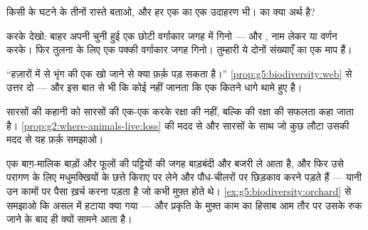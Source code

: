 \begin{exercise}[$\star$]\label{exo:g5:biodiversity:7}
किसी  के घटने के तीनों रास्ते बताओ, और हर एक का एक उदाहरण भी।
\emph{} का क्या अर्थ है?
\end{exercise}

\begin{exercise}[$\star$]\label{exo:g5:biodiversity:8}
करके देखो: बाहर अपनी चुनी हुई एक छोटी वर्गाकार जगह में  गिनो
---  और , नाम लेकर या वर्णन करके। फिर तुलना के लिए एक पक्की
वर्गाकार जगह गिनो। तुम्हारी ये दोनों संख्याएँ  का एक माप
हैं।
\end{exercise}

\begin{exercise}[$\star\star$]\label{exo:g5:biodiversity:9}
``हज़ारों में से भृंग की एक  खो जाने से क्या फ़र्क़ पड़ सकता
है।'' \cref{prop:g5:biodiversity:web} से उत्तर दो --- और इस बात से भी
कि कोई नहीं जानता कि एक  कितने धागे थामे हुए है।
\end{exercise}

\begin{exercise}[$\star\star$]\label{exo:g5:biodiversity:10}
सारसों की कहानी को सारसों की एक-एक करके रक्षा की नहीं, बल्कि
\emph{} की रक्षा की सफलता कहा जाता है।
\cref{prop:g2:where-animals-live:loss} की मदद से और सारसों के साथ जो
कुछ लौटा उसकी मदद से यह फ़र्क़ समझाओ।
\end{exercise}

\begin{exercise}[$\star\star\star$]\label{exo:g5:biodiversity:11}
एक बाग़-मालिक बाड़ों और फूलों की पट्टियों की जगह बाड़बंदी और बजरी ले
आता है, और फिर उसे परागण के लिए मधुमक्खियों के छत्ते किराए पर लेने और
पौध-चीलरों पर छिड़काव करने पड़ते हैं --- यानी उन कामों पर पैसा ख़र्च
करना पड़ता है जो कभी मुफ़्त होते थे।
\cref{ex:g5:biodiversity:orchard} से समझाओ कि असल में हटाया क्या गया
--- और प्रकृति के मुफ़्त काम का हिसाब आम तौर पर उसके रुक जाने के बाद ही
क्यों सामने आता है।
\end{exercise}

